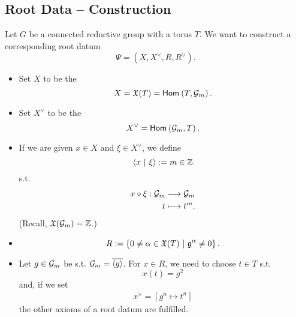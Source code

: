 \subsection{Root Data -- Construction}
Let $G$ be a connected reductive group with a torus $T$. We want to construct a corresponding root datum
\[ \Psi = (X, X^\vee, R, R^\vee). \]
\begin{itemize}
	\item Set $X$ to be the 
	\[ X = \mathfrak{X}(T) = \textsf{Hom}_{}\left(T, \mathcal{G}_m\right). \]
	\item Set $X^\vee$ to be the 
	\[ X^\vee =  \textsf{Hom}_{}\left(\mathcal{G}_m, T\right). \]
	\item If we are given $x \in X$ and $\xi \in X^\vee$, we define
	\[ \left<x ~ | ~ \xi\right> := m \in \mathbb{Z} \]
	s.t.
	\begin{align*}
	x \circ \xi : \mathcal{G}_m & \overset{}{\longrightarrow} \mathcal{G}_m\\
	t & \longmapsto t^m.
	\end{align*}
	(Recall, $\mathfrak{X}(\mathcal{G}_m) = \mathbb{Z}$.)
	\item
	\[ R:= \left\lbrace0\neq \alpha \in \mathfrak{X}(T) ~ | ~ \mathfrak{g}^\alpha \neq 0\right\rbrace. \]
	\item Let $g \in \mathcal{G}_m$ be s.t. $\mathcal{G}_m = \overline{\left<g\right>}$. For $x \in R$, we need to choose $t \in T$ s.t.
	\[ x(t) = g^2 \]
	and, if we set
	\begin{align*}
	x^\vee = [g^n \mapsto t^n]
	\end{align*}
	the other axioms of a root datum are fulfilled.
\end{itemize}

